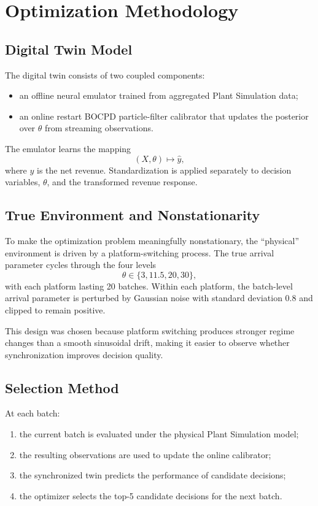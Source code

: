 \documentclass[11pt]{article}
\begin{document}
\section{Optimization Methodology}
\subsection{Digital Twin Model}
The digital twin consists of two coupled components:
\begin{itemize}[leftmargin=1.5em]
    \item an offline neural emulator trained from aggregated Plant Simulation data;
    \item an online restart BOCPD particle-filter calibrator that updates the posterior over $\theta$ from streaming observations.
\end{itemize}

The emulator learns the mapping
\[
(X,\theta)\mapsto \widehat{y},
\]
where $y$ is the net revenue. Standardization is applied separately to decision variables, $\theta$, and the transformed revenue response.

\subsection{True Environment and Nonstationarity}
To make the optimization problem meaningfully nonstationary, the ``physical'' environment is driven by a platform-switching process. The true arrival parameter cycles through the four levels
\[
\theta \in \{3, 11.5, 20, 30\},
\]
with each platform lasting 20 batches. Within each platform, the batch-level arrival parameter is perturbed by Gaussian noise with standard deviation 0.8 and clipped to remain positive.

This design was chosen because platform switching produces stronger regime changes than a smooth sinusoidal drift, making it easier to observe whether synchronization improves decision quality.

\subsection{Selection Method}
At each batch:
\begin{enumerate}[leftmargin=1.5em]
    \item the current batch is evaluated under the physical Plant Simulation model;
    \item the resulting observations are used to update the online calibrator;
    \item the synchronized twin predicts the performance of candidate decisions;
    \item the optimizer selects the top-5 candidate decisions for the next batch.
\end{enumerate}
\end{document}

